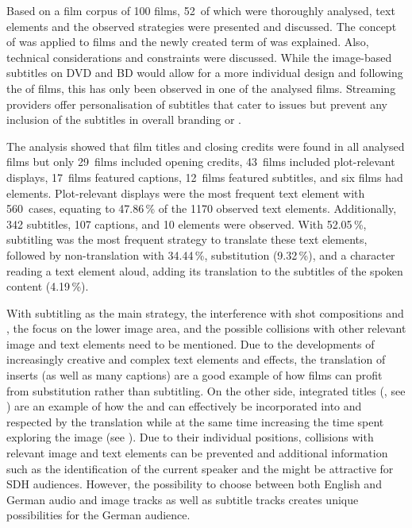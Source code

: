 Based on a film corpus of 100 films, 52~of which were thoroughly analysed, text elements and the observed  strategies were presented and discussed. The concept of  was applied to films and the newly created term of  was explained. Also, technical considerations and constraints were discussed. While the image-based subtitles on DVD and BD would allow for a more individual design and  following the  of films, this has only been observed in one of the analysed films. Streaming providers offer personalisation of subtitles that cater to  issues but prevent any inclusion of the subtitles in overall branding or .

The analysis showed that film titles and closing credits were found in all analysed films but only 29~films included opening credits, 43~films included plot-relevant displays, 17~films featured captions, 12~films featured subtitles, and six films had  elements. Plot-relevant displays were the most frequent text element with 560~cases, equating to 47.86\,\% of the 1170 observed text elements. Additionally, 342 subtitles, 107 captions, and 10  elements were observed. With 52.05\,\%, subtitling was the most frequent strategy to translate these text elements, followed by non-translation with 34.44\,\%, substitution (9.32\,\%), and a character reading a text element aloud, adding its translation to the subtitles of the spoken content (4.19\,\%).


With subtitling as the main strategy, the interference with shot compositions and , the focus on the lower image area, and the possible collisions with other relevant image and text elements need to be mentioned. Due to the developments of increasingly creative and complex text elements and effects, the translation of inserts (as well as many captions) are a good example of how films can profit from substitution rather than subtitling. On the other side, integrated titles (\citealt{Fox2012}, see ) are an example of how the  and  can effectively be incorporated into and respected by the translation while at the same time increasing the time spent exploring the image (see ). Due to their individual positions, collisions with relevant image and text elements can be prevented and additional information such as the identification of the current speaker and the  might be attractive for SDH audiences. However, the possibility to choose between both English and German audio and image tracks as well as subtitle tracks creates unique possibilities for the German audience.


